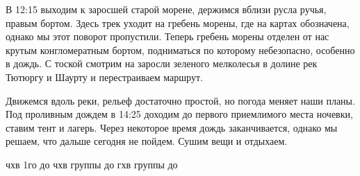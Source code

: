 В 12:15  выходим к заросшей старой морене, держимся вблизи русла ручья, правым бортом. Здесь трек уходит на гребень морены, где на картах обозначена, однако мы этот поворот пропустили. Теперь гребень морены отделен от нас крутым конгломератным бортом, подниматься по которому небезопасно, особенно в дождь. С тоской смотрим на заросли зеленого мелколесья в долине рек Тютюргу и Шаурту и перестраиваем маршрут.

Движемся вдоль реки, рельеф достаточно простой, но погода меняет наши планы. Под проливным дождем в 14:25 доходим до первого приемлимого места ночевки, ставим тент и лагерь. Через некоторое время дождь заканчивается, однако мы решаем, что дальше сегодня не пойдем. Сушим вещи и отдыхаем.









чхв 1го до
чхв группы до
гхв группы до




    \FloatBarrier
